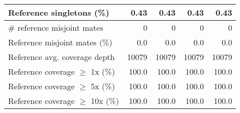 \documentclass[12pt,a4paper]{article}
\begin{document}
\begin{table}[ht]
\begin{center}
\begin{tabular}{|l*{4}{|r}|}
Reference singletons (\%) & 0.43 & 0.43 & 0.43 & 0.43 \\ \hline
\# reference misjoint mates & 0 & 0 & 0 & 0 \\ \hline
Reference misjoint mates (\%) & 0.0 & 0.0 & 0.0 & 0.0 \\ \hline
Reference avg. coverage depth & 10079 & 10079 & 10079 & 10079 \\ \hline
Reference coverage $\geq$ 1x (\%) & 100.0 & 100.0 & 100.0 & 100.0 \\ \hline
Reference coverage $\geq$ 5x (\%) & 100.0 & 100.0 & 100.0 & 100.0 \\ \hline
Reference coverage $\geq$ 10x (\%) & 100.0 & 100.0 & 100.0 & 100.0 \\ \hline
\end{tabular}
\end{center}
\end{table}
\end{document}

